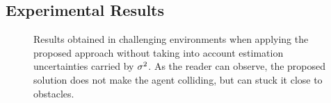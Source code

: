 \subsection{Experimental Results}%
\label{SEC:CBF-RESULTS}
\begin{figure}[!t]
	\begin{center}
		\begin{minipage}{.45\linewidth}
			\centering
		\end{minipage}
		\begin{minipage}{.45\linewidth}
			\centering
		\end{minipage}
	\end{center}
	\caption{Results obtained in challenging environments when applying the proposed approach without
    taking into account estimation uncertainties carried by $\sigma^2$. As the reader can observe, the proposed solution
    does not make the agent colliding, but can stuck it close to obstacles.}%
    \label{FIG:CBF-RESULTS-FAIL}
\end{figure}
